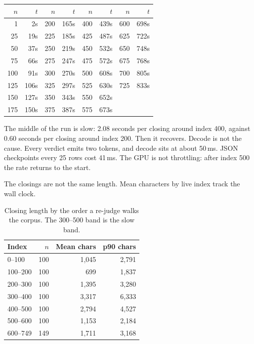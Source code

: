 \begin{center}
{\small\begin{tabular}{rrrrrrrr}
\toprule
$n$ & $t$ & $n$ & $t$ & $n$ & $t$ & $n$ & $t$ \\
\midrule
1 & 2s & 200 & 165s & 400 & 439s & 600 & 698s \\
25 & 19s & 225 & 185s & 425 & 487s & 625 & 722s \\
50 & 37s & 250 & 219s & 450 & 532s & 650 & 748s \\
75 & 66s & 275 & 247s & 475 & 572s & 675 & 768s \\
100 & 91s & 300 & 270s & 500 & 608s & 700 & 805s \\
125 & 106s & 325 & 297s & 525 & 630s & 725 & 833s \\
150 & 127s & 350 & 343s & 550 & 652s \\
175 & 150s & 375 & 387s & 575 & 673s \\
\bottomrule
\end{tabular}}
\end{center}

The middle of the run is slow: 2.08 seconds per closing around index
400, against 0.60 seconds per closing around index 200. Then it
recovers. Decode is not the cause. Every verdict emits two tokens, and
decode sits at about 50\,ms. JSON checkpoints every 25 rows cost
41\,ms. The GPU is not throttling: after index 500 the rate returns to
the start.

The closings are not the same length. Mean characters by live index
track the wall clock.

\begin{table}[ht]
\centering
{\small\begin{tabular}{lrrr}
\toprule
Index & $n$ & Mean chars & p90 chars \\
\midrule
0--100 & 100 & 1{,}045 & 2{,}791 \\
100--200 & 100 & 699 & 1{,}837 \\
200--300 & 100 & 1{,}395 & 3{,}280 \\
300--400 & 100 & 3{,}317 & 6{,}333 \\
400--500 & 100 & 2{,}794 & 4{,}527 \\
500--600 & 100 & 1{,}153 & 2{,}184 \\
600--749 & 149 & 1{,}711 & 3{,}168 \\
\bottomrule
\end{tabular}}
\caption{Closing length by the order a re-judge walks the corpus. The 300--500 band is the slow band.}
\label{tab:len}
\end{table}


